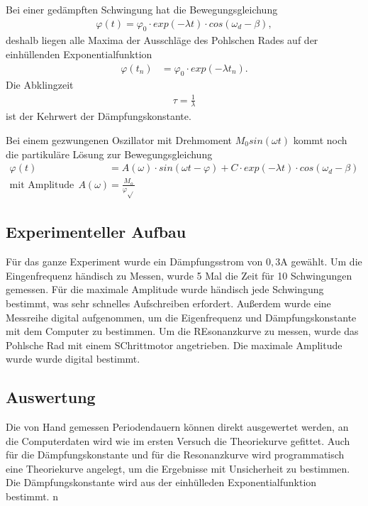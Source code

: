 \documentclass[11pt, a4paper]{article}
\begin{document}
    Bei einer gedämpften Schwingung hat die Bewegungsgleichung
    \begin{align}
        \varphi(t) = \varphi_0 \cdot exp(-\lambda t) \cdot cos(\omega_d - \beta), \label{theo5}
    \end{align}
    deshalb liegen alle Maxima der Ausschläge des Pohlschen Rades auf der einhüllenden Exponentialfunktion
    \begin{align}
        \varphi(t_n) &= \varphi_0 \cdot exp(-\lambda t_n).
    \end{align}
    Die Abklingzeit
    \begin{align}
        \tau = \frac{1}{\lambda}
    \end{align}
    ist der Kehrwert der Dämpfungskonstante.

    Bei einem gezwungenen Oszillator mit Drehmoment $M_0 sin(\omega t)$ kommt noch die partikuläre Lösung zur Bewegungsgleichung
    \begin{align}
        \varphi(t) &= A(\omega) \cdot sin(\omega t - \varphi) + C \cdot exp(-\lambda t) \cdot cos(\omega_d - \beta) \\
        \text{mit Amplitude}  \ \ A(\omega) &= \frac{M_o}{\varphi \sqrt{}}
    \end{align}

    \subsection{Experimenteller Aufbau}
    Für das ganze Experiment wurde ein Dämpfungsstrom von $0,3 \si{\ampere}$ gewählt.
    Um die Eingenfrequenz händisch zu Messen, wurde 5 Mal die Zeit für 10 Schwingungen gemessen.
    Für die maximale Amplitude wurde händisch jede Schwingung bestimmt, was sehr schnelles Aufschreiben erfordert.
    Außerdem wurde eine Messreihe digital aufgenommen, um die Eigenfrequenz und Dämpfungskonstante mit dem Computer zu bestimmen.
    Um die REsonanzkurve zu  messen, wurde das Pohlsche Rad mit einem SChrittmotor angetrieben. Die maximale Amplitude wurde
    wurde digital bestimmt.

    \subsection{Auswertung}
    Die von Hand gemessen Periodendauern können direkt ausgewertet werden, an die Computerdaten
    wird wie im ersten Versuch die Theoriekurve gefittet. Auch für die Dämpfungskonstante und für die
    Resonanzkurve wird programmatisch eine Theoriekurve angelegt, um die Ergebnisse mit Unsicherheit
    zu bestimmen. Die Dämpfungskonstante wird aus der einhülleden Exponentialfunktion bestimmt.
n
\end{document}
